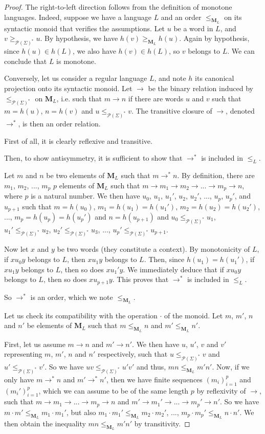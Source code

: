 \documentclass[a4paper,UKenglish,cleveref, autoref, thm-restate]{lipics-v2021}
\renewcommand{\alph}{\part(\Sigma)}
\newcommand{\op}{\cdot}
\renewcommand{\part}{\mathcal{P}}
\newcommand{\M}{\mathbf{M}}
\newcommand{\leqml}{\leq_{\mathbf{M}_L}}
\newcommand{\geqml}{\geq_{\mathbf{M}_L}}
\newcommand{\leqa}{\leq_{\alph^*}}
\newcommand{\geqa}{\geq_{\alph^*}}
\begin{document}
\begin{proof}
    The right-to-left direction follows from the definition of monotone languages. Indeed, suppose we have a language $L$ and an order $\leqml$ on its syntactic monoid that verifies the assumptions. Let $u$ be a word in $L$, and $v\geqa u$. By hypothesis, we have $h(v)\geqml h(u)$. Again by hypothesis, since $h(u)\in h(L)$, we also have $h(v)\in h(L)$, so $v$ belongs to $L$. We can conclude that $L$ is monotone.

    Conversely, let us consider a regular language $L$, and note $h$ its canonical projection onto its syntactic monoid. Let $\to$ be the binary relation induced by $\leqa$ on $\M_L$, i.e. such that $m \to n$ if there are words $u$ and $v$ such that $m=h(u)$, $n=h(v)$ and $u \leqa v$. The transitive closure of $\to$, denoted $\to^*$, is then an order relation.
 
    First of all, it is clearly reflexive and transitive.

    Then, to show antisymmetry, it is sufficient to show that $\to^*$ is included in $\leq_L$.

    Let $m$ and $n$ be two elements of $\M_L$ such that $m \to^* n$. By definition, there are $m_1$, $m_2$, ..., $m_p$ $p$ elements of $\M_L$ such that $m \to m_1 \to m_2 \to ... \to m_p \to n$,
    where $p$ is a natural number.
    We then have $u_0$, $u_1$, $u_1'$, $u_2$, $u_2'$, ..., $u_p$, $u_p'$, and $u_{p+1}$ such that $m = h(u_0)$, $m_1 = h(u_1) = h(u_1')$, $m_2 = h(u_2) = h(u_2')$, ..., $m_p = h(u_p) = h(u_p')$ and $n = h(u_{p+1})$ and $u_0 \leqa u_1$, $u_1' \leqa u_2$, $u_2' \leqa u_3$, ..., $u_p' \leqa u_{p+1}$.

    Now let $x$ and $y$ be two words (they constitute a context). By monotonicity of $L$, if $xu_0y$ belongs to $L$, then $xu_1y$ belongs to $L$. Then, since $h(u_1) = h(u_1')$, if $xu_1y$ belongs to $L$, then so does $xu_1'y$. We immediately deduce that if $xu_0y$ belongs to $L$, then so does $xu_{p+1}y$. This proves that $\to^*$ is included in $\leq_L$.

    So $\to^*$ is an order, which we note $\leqml$.

    Let us check its compatibility with the operation $\op$ of the monoid.
    Let $m$, $m'$, $n$ and $n'$ be elements of $\M_L$ such that $m \leqml n$ and $m' \leqml n'$.

    First, let us assume $m \to n$ and $m' \to n'$. We then have $u$, $u'$, $v$ and $v'$ representing $m$, $m'$, $n$ and $n'$ respectively, such that $u \leqa v$ and $u' \leqa v'$. So we have $uv \leqa u'v'$ and thus, $mn \leqml m'n'$. Now, if we only have $m \to^* n$ and $m' \to^* n'$, then we have finite sequences $(m_i)_{i=1}^p$ and $(m_i')_{i=1}^p$, which we can assume to be of the same length $p$ by reflexivity of $\to$, such that $m \to m_1 \to ... \to m_p \to n$ and $m' \to m_1' \to ... \to m_p' \to n'$. So we have $m \op m' \leqml m_1 \op m_1'$, but also $m_1 \op m_1' \leqml m_2 \op m_2'$, ..., $m_p \op m_p' \leqml n \op n'$. We then obtain the inequality $mn \leqml m'n'$ by transitivity.




\end{proof}
\end{document}
